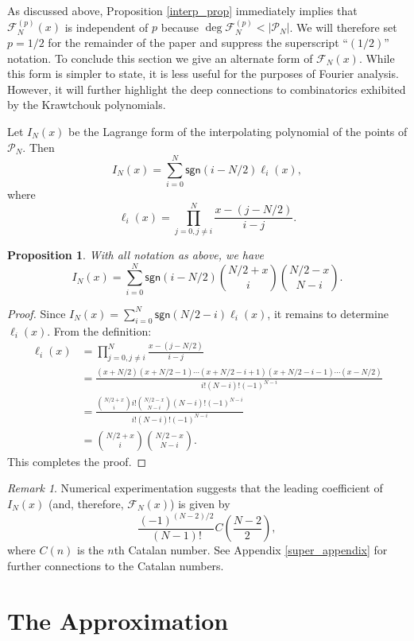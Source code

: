 \documentclass{amsart}
\newcommand{\sgn}{\mathsf{sgn}}
\theoremstyle{plain}
\newtheorem{prop}[equation]{Proposition}
\theoremstyle{remark}
\newtheorem{rmk}[equation]{Remark}
\begin{document}
As discussed above, Proposition \ref{interp_prop} immediately implies that $\mathcal{F}_N^{(p)}(x)$ is independent of $p$ because $\deg \mathcal{F}_N^{(p)} < |\mathcal{P}_N|$.  We will therefore set $p=1/2$ for the remainder of the paper and suppress the superscript ``$(1/2)$'' notation. To conclude this section we give an alternate form of $\mathcal{F}_N(x)$.  While this form is simpler to state, it is less useful for the purposes of Fourier analysis.  However, it will further highlight the deep connections to combinatorics exhibited by the Krawtchouk polynomials. 

Let $I_N(x)$ be the Lagrange form of the interpolating polynomial of the points of $\mathcal{P}_N$.  Then 
\[
I_N(x)=\sum_{i=0}^{N} \sgn(i-N/2)\ell_i(x),
\]
where
\[
\ell_i(x)=\prod_{j=0, j\neq i}^N \frac{x-(j-N/2)}{i-j}.
\]


\begin{prop} \label{interp_prop2}
With all notation as above, we have 
\[
I_N(x)=\sum_{i=0}^{N} \sgn(i-N/2)\binom{N/2+x}{i}\binom{N/2-x}{N-i}.
\]
\end{prop}

\begin{proof}
Since $I_N(x) = \sum_{i=0}^N\sgn(N/2-i)\ell_i(x)$, it remains to determine $\ell_i(x)$. From the definition:
\begin{align*}
\ell_i(x) &= \prod_{j=0, j\neq i}^N \frac{x-(j-N/2)}{i-j} \\
&=
\frac{(x+N/2)(x+N/2-1)\cdots(x+N/2-i+1)(x+N/2-i-1)\cdots(x-N/2)}{i!(N-i)!(-1)^{N-i}}\\
&=\frac{\binom{N/2+x}{i}i!\binom{N/2-x}{N-i}(N-i)!(-1)^{N-i}}{i!(N-i)!(-1)^{N-i}}\\
&=\binom{N/2+x}{i}\binom{N/2-x}{N-i}.
\end{align*}
This completes the proof.
\end{proof}

\begin{rmk}
Numerical experimentation suggests that the leading coefficient of ${I}_N(x)$ (and, therefore, $\mathcal{F}_N(x)$) is given by 
\[
\frac{(-1)^{(N-2)/2}}{(N-1)!} C\left( \frac{N-2}{2} \right),
\]
where $C(n)$ is the $n$th Catalan number.  See Appendix \ref{super_appendix} for further connections to the Catalan numbers. 
\end{rmk}


\section{The Approximation} \label{heuristic}
\end{document}
